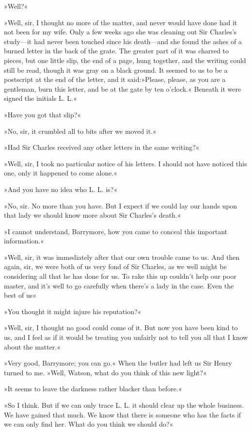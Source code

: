 »Well?«

»Well, sir, I thought no more of the matter, and never would have done had it not been for my wife. Only a few weeks ago she was cleaning out Sir Charles's study\allowbreak---\allowbreak it had never been touched since his death\allowbreak---\allowbreak and she found the ashes of a burned letter in the back of the grate. The greater part of it was charred to pieces, but one little slip, the end of a page, hung together, and the writing could still be read, though it was gray on a black ground. It seemed to us to be a postscript at the end of the letter, and it said:»Please, please, as you are a gentleman, burn this letter, and be at the gate by ten o'clock.« Beneath it were signed the initials L. L.«

»Have you got that slip?«

»No, sir, it crumbled all to bits after we moved it.«

»Had Sir Charles received any other letters in the same writing?«

»Well, sir, I took no particular notice of his letters. I should not have noticed this one, only it happened to come alone.«

»And you have no idea who L. L. is?«

»No, sir. No more than you have. But I expect if we could lay our hands upon that lady we should know more about Sir Charles's death.«

»I cannot understand, Barrymore, how you came to conceal this important information.«

»Well, sir, it was immediately after that our own trouble came to us. And then again, sir, we were both of us very fond of Sir Charles, as we well might be considering all that he has done for us. To rake this up couldn't help our poor master, and it's well to go carefully when there's a lady in the case. Even the best of us\longdash «

»You thought it might injure his reputation?«

»Well, sir, I thought no good could come of it. But now you have been kind to us, and I feel as if it would be treating you unfairly not to tell you all that I know about the matter.«

»Very good, Barrymore; you can go.« When the butler had left us Sir Henry turned to me. »Well, Watson, what do you think of this new light?«

»It seems to leave the darkness rather blacker than before.«

»So I think. But if we can only trace L. L. it should clear up the whole business. We have gained that much. We know that there is someone who has the facts if we can only find her. What do you think we should do?«


